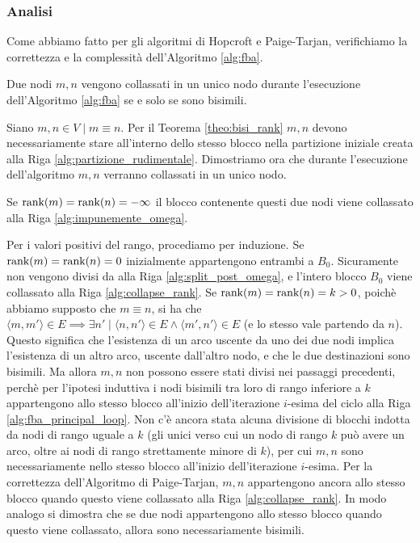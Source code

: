 \subsubsection{Analisi}
Come abbiamo fatto per gli algoritmi di Hopcroft e Paige-Tarjan, verifichiamo la correttezza e la complessità dell'Algoritmo \ref{alg:fba}.
\begin{theorem}
    Due nodi $m,n$ vengono collassati in un unico nodo durante l'esecuzione dell'Algoritmo \ref{alg:fba} se e solo se sono bisimili.
\end{theorem}
\begin{proof2}
    Siano $m,n \in V \mid m \equiv n$. Per il Teorema \ref{theo:bisi_rank} $m,n$ devono necessariamente stare all'interno dello stesso blocco nella partizione iniziale creata alla Riga \ref{alg:partizione_rudimentale}. Dimostriamo ora che durante l'esecuzione dell'algoritmo $m,n$ verranno collassati in un unico nodo.

    Se $\textup{rank}(m) = \textup{rank}(n) = -\infty$ il blocco contenente questi due nodi viene collassato alla Riga \ref{alg:impunemente_omega}.

    Per i valori positivi del rango, procediamo per induzione. Se $\textup{rank}(m) = \textup{rank}(n) = 0$ inizialmente appartengono entrambi a $B_0$. Sicuramente non vengono divisi da  alla Riga \ref{alg:split_post_omega}, e l'intero blocco $B_0$ viene collassato alla Riga \ref{alg:collapse_rank}. Se $\textup{rank}(m) = \textup{rank}(n) = k > 0$, poichè abbiamo supposto che $m \equiv n$, si ha che $\langle m, m' \rangle \in E \implies \exists n' \mid \langle n, n' \rangle \in E \land \langle m', n' \rangle \in E$ (e lo stesso vale partendo da $n$). Questo significa che l'esistenza di un arco uscente da uno dei due nodi implica l'esistenza di un altro arco, uscente dall'altro nodo, e che le due destinazioni sono bisimili. Ma allora $m,n$ non possono essere stati divisi nei passaggi precedenti, perchè per l'ipotesi induttiva i nodi bisimili tra loro di rango inferiore a $k$ appartengono allo stesso blocco all'inizio dell'iterazione $i$-esima del ciclo alla Riga \ref{alg:fba_principal_loop}. Non c'è ancora stata alcuna divisione di blocchi indotta da nodi di rango uguale a $k$ (gli unici verso cui un nodo di rango $k$ può avere un arco, oltre ai nodi di rango strettamente minore di $k$), per cui $m,n$ sono necessariamente nello stesso blocco all'inizio dell'iterazione $i$-esima. Per la correttezza dell'Algoritmo di Paige-Tarjan, $m,n$ appartengono ancora allo stesso blocco quando questo viene collassato alla Riga \ref{alg:collapse_rank}. In modo analogo si dimostra che se due nodi appartengono allo stesso blocco quando questo viene collassato, allora sono necessariamente bisimili.
\end{proof2}
